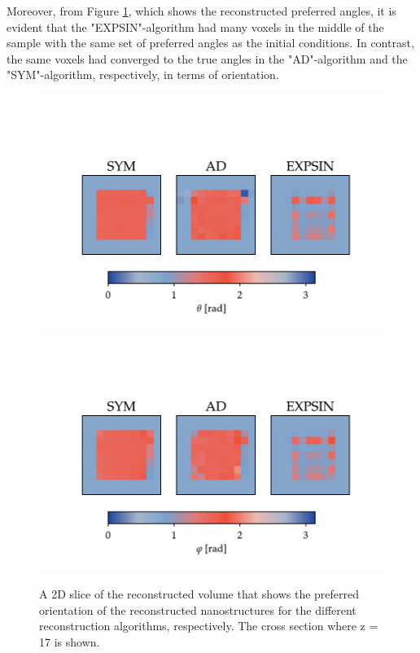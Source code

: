 \clearpage

Moreover, from Figure \ref{fig:phantom_reconstruction_2D_angles}, which shows the reconstructed preferred angles,
it is evident that the "EXPSIN"-algorithm had many voxels in the middle of the sample with the same set of preferred angles as the initial conditions.
In contrast, the same voxels had converged to the true angles in the "AD"-algorithm and the "SYM"-algorithm, respectively,
in terms of orientation.


\begin{figure}[h!]
    \centering
    \includegraphics[trim = {0 0 0 2.5cm}, clip, width = 1\textwidth]{./svg-inkscape/P_slices_theta_svg-tex.pdf}
    \includegraphics[trim = {0 0 0 2.5cm}, clip, width = 1\textwidth]{./svg-inkscape/P_slices_phi_svg-tex.pdf}
    \caption{ A 2D slice of the reconstructed volume that shows the preferred orientation of the reconstructed nanostructures for the different reconstruction algorithms, respectively.
        The cross section where z = 17 is shown.}
    \label{fig:phantom_reconstruction_2D_angles}
\end{figure}




